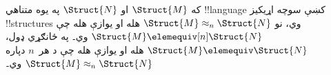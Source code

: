 \documentclass[../../../include/open-logic-section]{subfiles}
\begin{document}
\begin{cor}
  که $\Struct{M}$ او $\Struct{N}$ په يوه متناهي !!{language} کښې
  سوچه اړيکيز !!{structure}s وي، نو $\Struct{M} \approx_n\Struct{N}$
  هله او يوازې هله چې $\Struct{M} \elemequiv[n] \Struct{N}$ وي۔ په
  ځانګړي ډول، $\Struct{M} \elemequiv \Struct{N}$ هله او يوازې هله
  چې د هر~$n$ دپاره $\Struct{M} \approx_n \Struct{N}$ وي۔
\end{cor}
\end{document}
